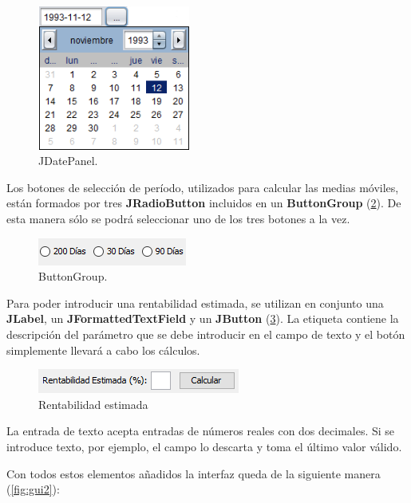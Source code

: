 \documentclass[12pt, a4paper]{book}
\begin{document}
\begin{figure}[htbp]
	\centering
	\includegraphics[width=5cm]{figuras/JDatePanel.png}
	\caption{JDatePanel.}
	\label{fig:JDatePanel}
	\end {figure}

Los botones de selección de período, utilizados para calcular las medias móviles, están formados por tres \textbf{JRadioButton} incluidos en un \textbf{ButtonGroup} (\ref{fig:ButtonGroup}). De esta manera sólo se podrá seleccionar uno de los tres botones a la vez.

\begin{figure}[htbp]
	\centering
	\includegraphics{figuras/ButtonGroup.png}
	\caption{ButtonGroup.}
	\label{fig:ButtonGroup}
	\end {figure}
	
Para poder introducir una rentabilidad estimada, se utilizan en conjunto una \textbf{JLabel}, un \textbf{JFormattedTextField} y un \textbf{JButton} (\ref{fig:calculos}). La etiqueta contiene la descripción del parámetro que se debe introducir en el campo de texto y el botón simplemente llevará a cabo los cálculos.

\begin{figure}[htbp]
	\centering
	\includegraphics{figuras/Calculos.png}
	\caption{Rentabilidad estimada}
	\label{fig:calculos}
	\end {figure}

La entrada de texto acepta entradas de números reales con dos decimales. Si se introduce texto, por ejemplo, el campo lo descarta y toma el último valor válido.
\newpage

Con todos estos elementos añadidos la interfaz queda de la siguiente manera (\ref{fig:gui2}):
\end{document}
